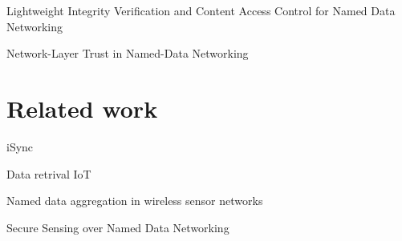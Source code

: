Lightweight Integrity Verification and Content Access Control for Named Data Networking~\cite{DBLP:journals/tifs/LiZZSF15}

Network-Layer Trust in Named-Data Networking~\cite{DBLP:journals/ccr/GhaliTU14}

\section{Related work}
iSync~\cite{DBLP:conf/acmicn/FuAC14}

Data retrival IoT~\cite{DBLP:conf/acmicn/AmadeoCM14}

Named data aggregation in wireless sensor networks~\cite{DBLP:conf/noms/AbidySLF14}

Secure Sensing over Named Data Networking~\cite{DBLP:conf/nca/BurkeGNT14}